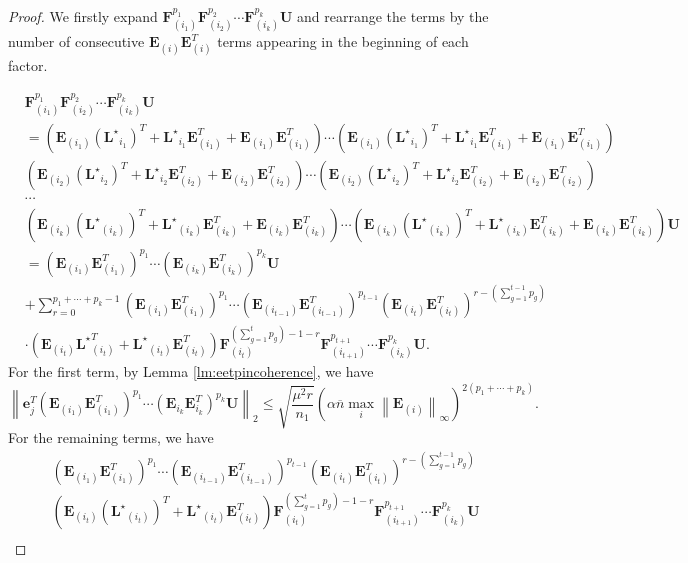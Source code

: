 \documentclass[twoside,11pt]{article}
\newcommand{\norm}[1]{\left\lVert#1\right\rVert}
\newcommand{\matE}{\mathbf{E}}
\newcommand{\matF}{\mathbf{F}}
\newcommand{\matLst}{{\mathbf{L}^\star}}
\newcommand{\matU}{\mathbf{U}}
\newcommand{\vece}{\mathbf{e}}
\newcommand{\bn}{{\overline{n}}}
\newcommand{\abnb}{\alpha \bn\max_{i}\norm{\matE_{(i)}}_{\infty}}
\newcommand{\murnone}{\frac{\mu^2 r}{n_1}}
\begin{document}
\begin{proof}
We firstly expand $\matF_{(i_1)}^{p_1}\matF_{(i_2)}^{p_2}\cdots\matF_{(i_k)}^{p_k}\matU$ and rearrange the terms by the number of consecutive $\matE_{(i)}\matE_{(i)}^T$ terms appearing in the beginning of each factor.

$$
\begin{aligned}
&\matF_{(i_1)}^{p_1}\matF_{(i_2)}^{p_2}\cdots\matF_{(i_k)}^{p_k}\matU\\
&=\left(\matE_{(i_1)}(\matLst_{i_1})^T+\matLst_{i_1}\matE_{(i_1)}^T+\matE_{(i_1)}\matE_{(i_1)}^T\right)\cdots\left(\matE_{(i_1)}(\matLst_{i_1})^T+\matLst_{i_1}\matE_{(i_1)}^T+\matE_{(i_1)}\matE_{(i_1)}^T\right)\\
&\left(\matE_{(i_2)}(\matLst_{i_2})^T+\matLst_{i_2}\matE_{(i_2)}^T+\matE_{(i_2)}\matE_{(i_2)}^T\right)\cdots\left(\matE_{(i_2)}(\matLst_{i_2})^T+\matLst_{i_2}\matE_{(i_2)}^T+\matE_{(i_2)}\matE_{(i_2)}^T\right)\\
&\cdots\\
&\left(\matE_{(i_k)}(\matLst_{(i_k)})^T+\matLst_{(i_k)}\matE_{(i_k)}^T+\matE_{(i_k)}\matE_{(i_k)}^T\right)\cdots\left(\matE_{(i_k)}(\matLst_{(i_k)})^T+\matLst_{(i_k)}\matE_{(i_k)}^T+\matE_{(i_k)}\matE_{(i_k)}^T\right)\matU\\
&=\left(\matE_{(i_1)}\matE_{(i_1)}^T\right)^{p_1}\cdots\left(\matE_{(i_{k})}\matE_{(i_{k})}^T\right)^{p_{k}}\matU\\
&+\sum_{r=0}^{p_1+\cdots+p_k-1}\left(\matE_{(i_1)}\matE_{(i_1)}^T\right)^{p_1}\cdots\left(\matE_{(i_{t-1})}\matE_{(i_{t-1})}^T\right)^{p_{t-1}}\left(\matE_{(i_t)}\matE_{(i_t)}^T\right)^{r-(\sum_{g=1}^{t-1}p_g)}\\
&\cdot \left(\matE_{(i_t)}\matLst_{(i_t)}^T+\matLst_{(i_t)}\matE_{(i_t)}^T\right)\matF_{(i_t)}^{(\sum_{g=1}^{t}p_g)-1-r}\matF_{(i_{t+1})}^{p_{t+1}}\cdots\matF_{(i_k)}^{p_k}\matU.
\end{aligned}
$$
For the first term, by Lemma \ref{lm:eetpincoherence}, we have
$$
\norm{\vece_j^T\left(\matE_{(i_1)}\matE_{(i_1)}^T\right)^{p_1}\cdots\left(\matE_{i_{k}}\matE_{i_{k}}^T\right)^{p_{k}}\matU}_2\le \sqrt{\murnone} \left(\abnb\right)^{2(p_1+\cdots+p_k)}.
$$
For the remaining terms, we have
$$
\begin{aligned}
&\left(\matE_{(i_1)}\matE_{(i_1)}^T\right)^{p_1}\cdots\left(\matE_{(i_{t-1})}\matE_{(i_{t-1})}^T\right)^{p_{t-1}}\left(\matE_{(i_t)}\matE_{(i_t)}^T\right)^{r-(\sum_{g=1}^{t-1}p_g)}\\
&\left(\matE_{(i_t)}(\matLst_{(i_t)})^T+\matLst_{(i_t)}\matE_{(i_t)}^T\right)\matF_{(i_t)}^{(\sum_{g=1}^{t}p_g)-1-r}\matF_{(i_{t+1})}^{p_{t+1}}\cdots\matF_{(i_k)}^{p_k}\matU\\

\end{aligned}$$
\end{proof}
\end{document}
